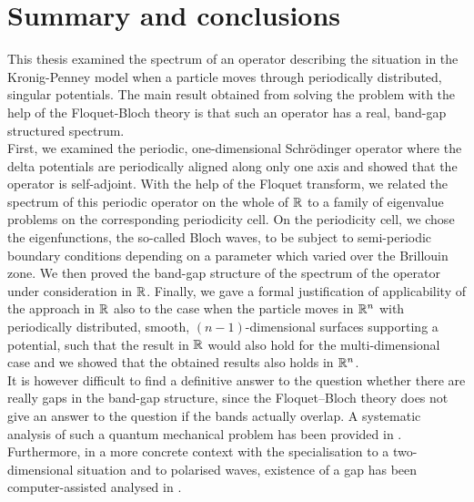 \chapter{Summary and conclusions} \label{chap:8}
	
This thesis examined the spectrum of an operator describing the situation in the Kronig-Penney model when a particle moves through periodically distributed, singular potentials. The main result obtained from solving the problem with the help of the Floquet-Bloch theory is that such an operator has a real, band-gap structured spectrum.
~\\

First, we examined the periodic, one-dimensional Schrödinger operator where the delta potentials are periodically aligned along only one axis and showed that the operator is self-adjoint. With the help of the Floquet transform, we related the spectrum of this periodic operator on the whole of $\mathbb{R}$ to a family of eigenvalue problems on the corresponding periodicity cell. On the periodicity cell, we chose the eigenfunctions, the so-called Bloch waves, to be subject to semi-periodic boundary conditions depending on a parameter which varied over the Brillouin zone. We then proved the band-gap structure of the spectrum of the operator under consideration in $\mathbb{R}$. Finally, we gave a formal justification of applicability of the approach in $\mathbb{R}$ also to the case when the particle moves in $\mathbb{R}^{n}$ with periodically distributed, smooth, $(n-1)$-dimensional surfaces supporting a potential, such that the result in $\mathbb{R}$ would also hold for the multi-dimensional case and we showed that the obtained results also holds in $\mathbb{R}^{n}$. 
~\\

It is however difficult to find a definitive answer to the question whether there are really gaps in the band-gap structure, since the Floquet–Bloch theory does not give an answer to the question if the bands actually overlap. A systematic analysis of such a quantum mechanical problem has been provided in \cite{albeverio2012solvable}. Furthermore, in a more concrete context with the specialisation to a two-dimensional situation and to polarised waves, existence of a gap has been computer-assisted analysed in \cite{hoang2009computer}. 
~\\


